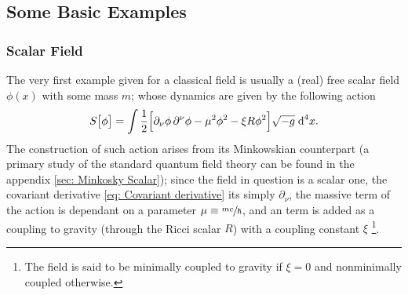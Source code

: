 \subsection{Some Basic Examples}
\subsubsection{Scalar Field}
The very first example given for a classical field is usually a (real) free scalar field $\phi(x)$ with some mass $m$; whose dynamics are given by the following action
\begin{equation}\label{eq: General scalar field action}
	S\big[\phi\big]=\int\frac{1}{2}\Big[\partial_\nu\phi\,\partial^\nu\phi-\mu^2\phi^2-\xi R\phi^2\Big]\sqrt{-g}\;\text{d}^4 x.
\end{equation}
The construction of such action arises from its Minkowskian counterpart (a primary study of the standard quantum field theory can be found in the appendix \ref{sec: Minkosky Scalar}); since the field in question is a scalar one, the covariant derivative \ref{eq: Covariant derivative} its simply $\partial_\nu$, the massive term of the action is dependant on a parameter $\mu\equiv\sfrac{mc}{\hbar}$, and an term is added as a coupling to gravity (through the Ricci scalar $R$) with a coupling constant $\xi$ \footnote{The field is said to be minimally coupled to gravity if $\xi=0$ and nonminimally coupled otherwise.}.

